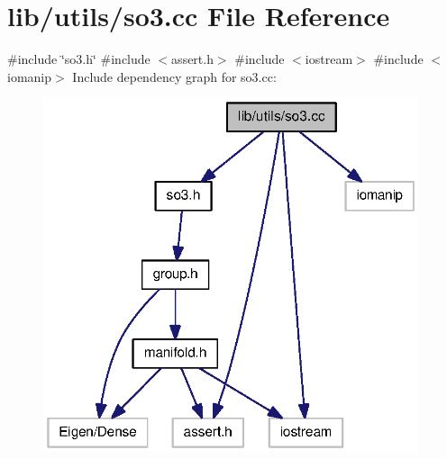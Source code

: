 \section{lib/utils/so3.cc \-File \-Reference}
\label{so3_8cc}
{\ttfamily \#include \char`\"{}so3.\-h\char`\"{}}\*
{\ttfamily \#include $<$assert.\-h$>$}\*
{\ttfamily \#include $<$iostream$>$}\*
{\ttfamily \#include $<$iomanip$>$}\*
\-Include dependency graph for so3.\-cc\-:\nopagebreak
\begin{figure}[H]
\begin{center}
\leavevmode
\includegraphics[width=312pt]{so3_8cc__incl}
\end{center}
\end{figure}
